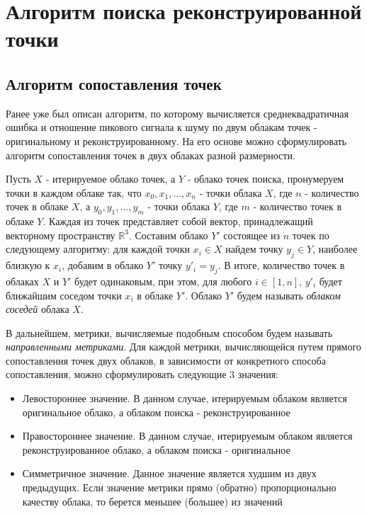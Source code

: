 \section{Алгоритм поиска реконструированной точки}

\subsection{Алгоритм сопоставления точек}

Ранее уже был описан алгоритм, по которому вычисляется среднеквадратичная ошибка
и отношение пикового сигнала к шуму по двум облакам точек - оригинальному и
реконструированному. На его основе можно сформулировать алгоритм сопоставления
точек в двух облаках разной размерности.

Пусть $X$ - итерируемое облако точек, а $Y$ - облако точек поиска, пронумеруем
точки в каждом облаке так, что $x_{0}, x_{1}, \dots, x_{n}$ - точки облака $X$,
где $n$ - количество точек в облаке $X$, а $y_{0}, y_{1}, \dots, y_{m}$ - точки
облака $Y$, где $m$ - количество точек в облаке $Y$. Каждая из точек
представляет собой вектор, принадлежащий векторному пространству
$\mathbb{R}^{3}$. Составим облако $Y'$ состоящее из $n$ точек по следующему
алгоритму: для каждой точки $x_{i} \in X$ найдем точку $y_{j} \in Y$, наиболее
близкую к $x_{i}$, добавим в облако $Y'$ точку $y'_{i} = y_{j}$. В итоге,
количество точек в облаках $X$ и $Y'$ будет одинаковым, при этом, для любого $i
\in \left[1, n\right]$, $y'_{i}$ будет ближайшим соседом точки $x_{i}$ в облаке
$Y'$. Облако $Y'$ будем называть \textit{облаком соседей} облака $X$.

В дальнейшем, метрики, вычисляемые подобным способом будем называть
\textit{направленными метриками}. Для каждой метрики, вычисляющейся путем
прямого сопоставления точек двух облаков, в зависимости от конкретного способа
сопоставления, можно сформулировать следующие 3 значения:

\begin{itemize}
    \item Левостороннее значение. В данном случае, итерируемым облаком является
    оригинальное облако, а облаком поиска - реконструированное
    \item Правостороннее значение. В данном случае, итерируемым облаком является
    реконструированное облако, а облаком поиска - оригинальное
    \item Симметричное значение. Данное значение является худшим из двух
    предыдущих. Если значение метрики прямо (обратно) пропорционально качеству
    облака, то берется меньшее (большее) из значений
\end{itemize}

